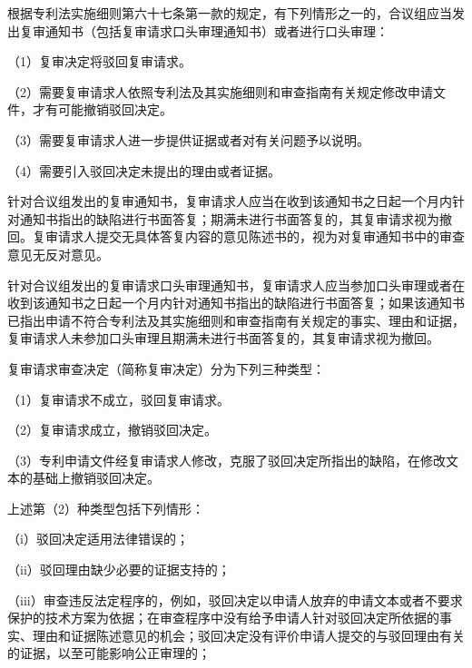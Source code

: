 根据专利法实施细则第六十七条第一款的规定，有下列情形之一的，合议组应当发出复审通知书（包括复审请求口头审理通知书）或者进行口头审理：

{\setlength{\parindent}{17.1bp}（1）复审决定将驳回复审请求。\par}

{\setlength{\parindent}{17.1bp}（2）需要复审请求人依照专利法及其实施细则和审查指南有关规定修改申请文件，才有可能撤销驳回决定。\par}

{\setlength{\parindent}{17.1bp}（3）需要复审请求人进一步提供证据或者对有关问题予以说明。\par}

{\setlength{\parindent}{17.1bp}（4）需要引入驳回决定未提出的理由或者证据。\par}

针对合议组发出的复审通知书，复审请求人应当在收到该通知书之日起一个月内针对通知书指出的缺陷进行书面答复；期满未进行书面答复的，其复审请求视为撤回。复审请求人提交无具体答复内容的意见陈述书的，视为对复审通知书中的审查意见无反对意见。

针对合议组发出的复审请求口头审理通知书，复审请求人应当参加口头审理或者在收到该通知书之日起一个月内针对通知书指出的缺陷进行书面答复；如果该通知书已指出申请不符合专利法及其实施细则和审查指南有关规定的事实、理由和证据，复审请求人未参加口头审理且期满未进行书面答复的，其复审请求视为撤回。

复审请求审查决定（简称复审决定）分为下列三种类型：

{\setlength{\parindent}{17.1bp}（1）复审请求不成立，驳回复审请求。\par}

{\setlength{\parindent}{17.1bp}（2）复审请求成立，撤销驳回决定。\par}

{\setlength{\parindent}{17.1bp}（3）专利申请文件经复审请求人修改，克服了驳回决定所指出的缺陷，在修改文本的基础上撤销驳回决定。\par}

上述第（2）种类型包括下列情形：

{\setlength{\parindent}{17.1bp}（i）驳回决定适用法律错误的；\par}

{\setlength{\parindent}{17.1bp}（ii）驳回理由缺少必要的证据支持的；\par}

{\setlength{\parindent}{17.1bp}（iii）审查违反法定程序的，例如，驳回决定以申请人放弃的申请文本或者不要求保护的技术方案为依据；在审查程序中没有给予申请人针对驳回决定所依据的事实、理由和证据陈述意见的机会；驳回决定没有评价申请人提交的与驳回理由有关的证据，以至可能影响公正审理的；\par}


